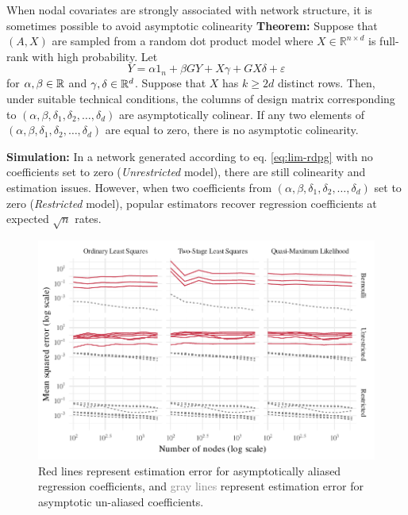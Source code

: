 \documentclass[final]{beamer}
\newlength{\colwidth}
\begin{document}
\begin{frame}[t]
\begin{columns}[t]
\begin{column}{\colwidth}
\begin{block}{When nodal covariates are strongly associated with network structure, it is sometimes possible to avoid asymptotic colinearity}
                \textbf{Theorem:} Suppose that $(A, X)$ are sampled from a random dot product model where $X \in \mathbb{R}^{n \times d}$ is full-rank with high probability. Let
                \begin{equation} \label{eq:lim-rdpg}
                    Y = \alpha 1_n + \beta G Y + X \gamma + G X \delta + \varepsilon
                \end{equation}
                for $\alpha, \beta \in \mathbb{R}$ and $\gamma, \delta \in \mathbb{R}^d$. Suppose that $X$ has $k \ge 2d$ distinct rows. Then, under suitable technical conditions, the columns of design matrix corresponding to $(\alpha, \beta, \delta_1, \delta_2, \dots, \delta_d)$ are asymptotically colinear. If any two elements of $(\alpha, \beta, \delta_1, \delta_2, \dots, \delta_d)$ are equal to zero, there is no asymptotic colinearity.

                \textbf{Simulation:} In a network generated according to eq. \eqref{eq:lim-rdpg} with no coefficients set to zero (\emph{Unrestricted} model), there are still colinearity and estimation issues. However, when two coefficients from $(\alpha, \beta, \delta_1, \delta_2, \dots, \delta_d)$ set to zero (\emph{Restricted} model), popular estimators recover regression coefficients at expected $\sqrt{n}$ rates.

                \begin{figure}
                    \centering
                    \includegraphics[width=\textwidth]{./figures/simulations/biometrika-mse-all.pdf}
                    \caption{\textcolor{Mahogany}{Red lines} represent estimation error for asymptotically aliased regression coefficients, and \textcolor{gray}{gray lines} represent estimation error for asymptotic un-aliased coefficients.}
                \end{figure}


\end{block}
\end{column}
\end{columns}
\end{frame}
\end{document}
